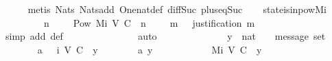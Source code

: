 \begin{isabellebody}
\ \ \ \ \isamarkupfalse%
\ {\isacharparenleft}metis\ Nats{\isacharunderscore}{}\ Nats{\isacharunderscore}add\ One{\isacharunderscore}nat{\isacharunderscore}def\ diff{\isacharunderscore}Suc{\isacharunderscore}{}\ plus{\isacharunderscore}{}{\isacharunderscore}eq{\isacharunderscore}Suc{\isacharparenright}%
\endisatagproof
{\isafoldproof}%
%
\isadelimproof
\isanewline
%
\endisadelimproof
\isanewline
\ \ \isamarkupfalse%
\ state{\isacharunderscore}is{\isacharunderscore}in{\isacharunderscore}pow{\isacharunderscore}M{\isacharunderscore}i\ {\isacharcolon}\isanewline
\ \ \ \ {\isachardoublequoteopen}{\isasymforall}\ {\isasymsigma}\ {\isasymin}\ {\isasymSigma}{\isachardot}\ {\isacharparenleft}{\isasymexists}\ n\ {\isasymin}\ {\isasymnat}{\isachardot}\ {\isasymsigma}\ {\isasymin}\ Pow\ {\isacharparenleft}M{\isacharunderscore}i\ {\isacharparenleft}V{\isacharcomma}\ C{\isacharcomma}\ {\isasymepsilon}{\isacharparenright}\ {\isacharparenleft}n\ {\isacharminus}\ {}{\isacharparenright}{\isacharparenright}\ {\isasymand}\ {\isacharparenleft}{\isasymforall}\ m\ {\isasymin}\ {\isasymsigma}{\isachardot}\ justification\ m\ {\isasymsubseteq}\ {\isasymsigma}{\isacharparenright}{\isacharparenright}{\isachardoublequoteclose}\ \isanewline
%
\isadelimproof
\ \ \ \ %
\endisadelimproof
%
\isatagproof
{}\isamarkupfalse%
\ {\isacharparenleft}simp\ add{\isacharcolon}\ {\isasymSigma}{\isacharunderscore}def{\isacharparenright}\isanewline
\ \ \ \ \isanewline
\ \ \ \ \isanewline
\ \ \ \ \isamarkupfalse%
\ auto\isanewline
\ \ \ \ \isamarkupfalse%
\ {\isacharminus}\isanewline
\ \ \ \ \ \ \isamarkupfalse%
\ y\ {\isacharcolon}{\isacharcolon}\ nat\ \ {\isasymsigma}\ {\isacharcolon}{\isacharcolon}\ {\isachardoublequoteopen}message\ set{\isachardoublequoteclose}\isanewline
\ \ \ \ \ \ \isamarkupfalse%
\ a{}{\isacharcolon}\ {\isachardoublequoteopen}{\isasymsigma}\ {\isasymin}\ {\isasymSigma}{\isacharunderscore}i\ {\isacharparenleft}V{\isacharcomma}\ C{\isacharcomma}\ {\isasymepsilon}{\isacharparenright}\ y{\isachardoublequoteclose}\isanewline
\ \ \ \ \ \ \isamarkupfalse%
\ a{}{\isacharcolon}\ {\isachardoublequoteopen}y\ {\isasymin}\ {\isasymnat}{\isachardoublequoteclose}\isanewline
\ \ \ \ \ \ \isamarkupfalse%
\ {\isachardoublequoteopen}{\isasymsigma}\ {\isasymsubseteq}\ M{\isacharunderscore}i\ {\isacharparenleft}V{\isacharcomma}\ C{\isacharcomma}\ {\isasymepsilon}{\isacharparenright}\ y{\isachardoublequoteclose}\isanewline

\end{isabellebody}
